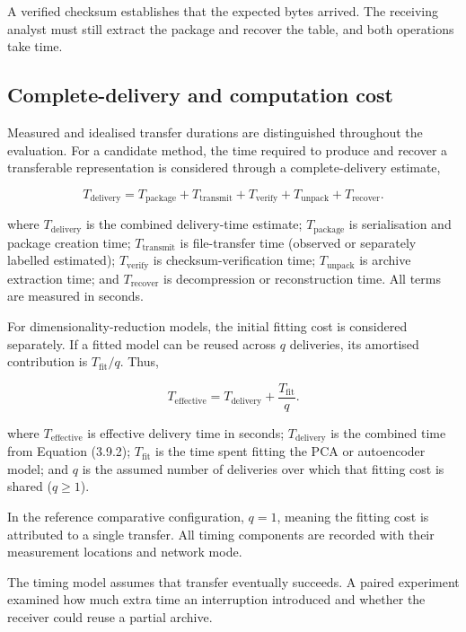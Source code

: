 \noindent A verified checksum establishes that the expected bytes arrived. The receiving analyst must still extract the package and recover the table, and both operations take time.

\subsection{Complete-delivery and computation cost}\label{complete-delivery-and-computation-cost}

Measured and idealised transfer durations are distinguished throughout
the evaluation. For a candidate method, the time required to produce and
recover a transferable representation is considered through a
complete-delivery estimate,

\[
T_{\mathrm{delivery}}=
T_{\mathrm{package}}+
T_{\mathrm{transmit}}+
T_{\mathrm{verify}}+
T_{\mathrm{unpack}}+
T_{\mathrm{recover}}.\tag{3.9.2}
\]

\noindent where \(T_{\mathrm{delivery}}\) is the combined delivery-time estimate;
\(T_{\mathrm{package}}\) is serialisation and package creation time;
\(T_{\mathrm{transmit}}\) is file-transfer time (observed or separately
labelled estimated); \(T_{\mathrm{verify}}\) is checksum-verification
time; \(T_{\mathrm{unpack}}\) is archive extraction time; and
\(T_{\mathrm{recover}}\) is decompression or reconstruction time. All
terms are measured in seconds.

\noindent For dimensionality-reduction models, the initial fitting cost is
considered separately. If a fitted model can be reused across \(q\)
deliveries, its amortised contribution is \(T_{\mathrm{fit}}/q\). Thus,

\[
T_{\mathrm{effective}}=
T_{\mathrm{delivery}}+
\frac{T_{\mathrm{fit}}}{q}.\tag{3.9.3}
\]

\noindent where \(T_{\mathrm{effective}}\) is effective delivery time in seconds;
\(T_{\mathrm{delivery}}\) is the combined time from Equation (3.9.2);
\(T_{\mathrm{fit}}\) is the time spent fitting the PCA or autoencoder
model; and \(q\) is the assumed number of deliveries over which that
fitting cost is shared (\(q\geq1\)).

\noindent In the reference comparative configuration, \(q=1\), meaning the fitting
cost is attributed to a single transfer. All timing components are
recorded with their measurement locations and network mode.

\noindent The timing model assumes that transfer eventually succeeds. A paired experiment examined how much extra time an interruption introduced and whether the receiver could reuse a partial archive.

